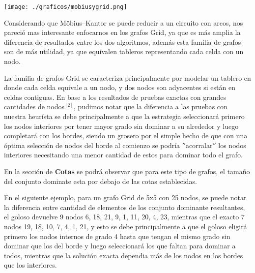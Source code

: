 \begin {center}
\texttt{[image: ./graficos/mobiusygrid.png]}
\end {center} 

Considerando que Möbius–Kantor se puede reducir a un circuito con arcos, nos pareció mas interesante enfocarnos en los grafos Grid, ya que es más amplia la diferencia de resultados entre los dos algoritmos, además esta familia de grafos son de más utilidad, ya que equivalen tableros representando cada celda con un nodo.

La familia de grafos Grid se caracteriza principalmente por modelar un tablero en donde cada celda equivale a un nodo, y dos nodos son adyacentes si están en celdas contiguas. En base a los resultados de pruebas exactas con grandes cantidades de nodos$^{[2]}$, pudimos notar que la diferencia a las pruebas con nuestra heurísta se debe principalmente a que la estrategia seleccionará primero los nodos interiores por tener mayor grado sin dominar a su alrededor y luego completará con los bordes, siendo un grosero por el simple hecho de que con una óptima selección de nodos del borde al comienzo se podría $''$acorralar$''$ los nodos interiores necesitando una menor cantidad de estos para dominar todo el grafo. 

En la sección de \textbf{Cotas} se podrá observar que para este tipo de grafos, el tamaño del conjunto dominate esta por debajo de las cotas establecidas.

En el siguiente ejemplo, para un grafo Grid de 5x5 con 25 nodos, se puede notar la diferencia entre cantidad de elementos de los conjunto dominante resultantes, el goloso devuelve 9 nodos {6, 18, 21, 9, 1, 11, 20, 4, 23}, mientras que el exacto 7 nodos {19, 18, 10, 7, 4, 1, 21}, y esto se debe principalmente a que el goloso eligirá primero los nodos internos de grado 4 hasta que tengan el mismo grado sin dominar que los del borde y luego seleccionará los que faltan para dominar a todos, mientras que la solución exacta dependia más de los nodos en los bordes que los interiores.
 
